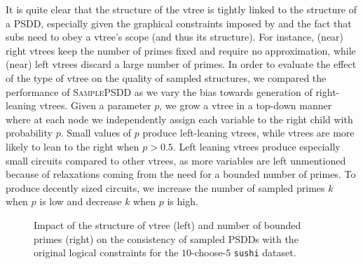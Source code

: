 It is quite clear that the structure of the vtree is tightly linked to the structure of a PSDD,
especially given the graphical constraints imposed by  and the fact that subs
need to obey a vtree's scope (and thus its structure). For instance, (near) right vtrees keep the
number of primes fixed and require no approximation, while (near) left vtrees discard a large
number of primes. In order to evaluate the effect of the type of vtree on the quality of sampled
structures, we compared the performance of \textsc{SamplePSDD} as we vary the bias towards
generation of right-leaning vtrees. Given a parameter $p$, we grow a vtree in a top-down manner
where at each node we independently assign each variable to the right child with probability $p$.
Small values of $p$ produce left-leaning vtrees, while vtrees are more likely to lean to the
right when $p>0.5$. Left leaning vtrees produce especially small circuits compared to other vtrees,
as more variables are left unmentioned because of relaxations coming from the need for a bounded
number of primes. To produce decently sized circuits, we increase the number of sampled primes $k$
when $p$ is low and decrease $k$ when $p$ is high.

\begin{figure}[t]
  \begin{subfigure}{0.495\textwidth}
    \caption{}
  \end{subfigure}
  \begin{subfigure}{0.495\textwidth}
    \caption{}
  \end{subfigure}
  \caption{Impact of the structure of vtree (left) and number of bounded primes (right) on the
    consistency of sampled PSDDs with the original logical constraints for the $10$-choose-$5$
    \texttt{sushi} dataset.}
  \label{fig:imp-comp}
\end{figure}

